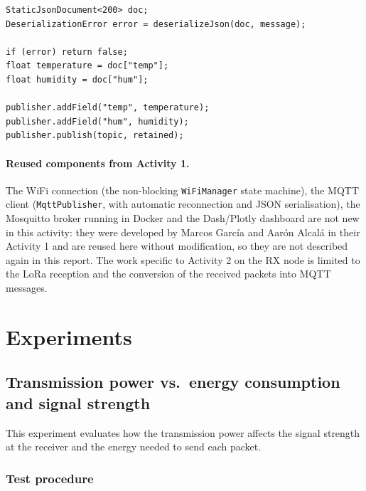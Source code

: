 \documentclass[informe,english]{plantilla}
\begin{document}
\begin{lstlisting}[style=arduino]
StaticJsonDocument<200> doc;
DeserializationError error = deserializeJson(doc, message);

if (error) return false;
float temperature = doc["temp"];
float humidity = doc["hum"];

publisher.addField("temp", temperature);
publisher.addField("hum", humidity);
publisher.publish(topic, retained);
\end{lstlisting}


\paragraph{Reused components from Activity 1.} The WiFi connection (the non-blocking \texttt{WiFiManager} state machine), the MQTT client (\texttt{MqttPublisher}, with automatic reconnection and JSON serialisation), the Mosquitto broker running in Docker and the Dash/Plotly dashboard are not new in this activity: they were developed by Marcos García and Aarón Alcalá in their Activity 1 and are reused here without modification, so they are not described again in this report. The work specific to Activity 2 on the RX node is limited to the LoRa reception and the conversion of the received packets into MQTT messages.

\section{Experiments}
\label{sec:experiments}

\subsection{Transmission power vs.\ energy consumption and signal strength}
\label{sec:exp-txpower}

This experiment evaluates how the transmission power affects the signal strength at the receiver and the energy needed to send each packet.

\subsubsection{Test procedure}
\end{document}
